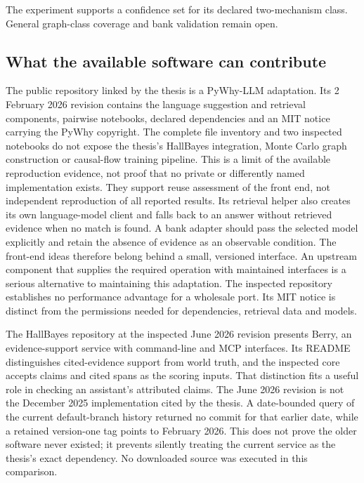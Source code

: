 The experiment supports a confidence set for its declared two-mechanism
class. General graph-class coverage and bank validation remain open.

\subsection{What the available software can contribute}

The public repository linked by the thesis is a PyWhy-LLM adaptation. Its
2 February 2026 revision contains the language suggestion and retrieval
components, pairwise notebooks, declared dependencies and an MIT notice
carrying the PyWhy copyright. The complete file inventory and two inspected notebooks do not expose the
thesis's HallBayes integration, Monte Carlo graph construction or causal-flow
training pipeline. This is a limit of the available reproduction evidence,
not proof that no private or differently named implementation exists. They support reuse
assessment of the front end, not independent reproduction of all reported
results. Its retrieval helper also creates its own language-model client and
falls back to an answer without retrieved evidence when no match is found.
A bank adapter should pass the selected model explicitly and retain the
absence of evidence as an observable condition. The front-end ideas therefore belong behind a small, versioned interface.
An upstream component that supplies the required operation with maintained
interfaces is a serious alternative to maintaining this adaptation. The
inspected repository establishes no performance advantage for a wholesale
port. Its MIT notice is distinct from the permissions needed for dependencies,
retrieval data and models.
\citep{closure30molerocode}

The HallBayes repository at the inspected June 2026 revision presents
Berry, an evidence-support service with command-line and MCP interfaces.
Its README distinguishes cited-evidence support from world truth, and the
inspected core accepts claims and cited spans as the scoring inputs.
That distinction fits a useful role in checking an assistant's attributed
claims. The June 2026 revision is not the December 2025 implementation cited
by the thesis. A date-bounded query of the current default-branch history
returned no commit for that earlier date, while a retained version-one tag
points to February 2026. This does not prove the older software never
existed; it prevents silently treating the current service as the thesis's
exact dependency. No downloaded source was executed in this comparison.
\citep{closure30berry}

